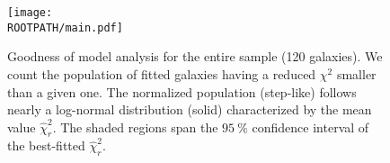 \begin{figure}%
	\centering%
	\texttt{[image: \\ROOTPATH/main.pdf]}%
	\caption{Goodness of model analysis for the entire sample (120 galaxies). We count the population of fitted galaxies having a reduced $\chi^2$ smaller than a given one. The normalized population (step-like) follows nearly a log-normal distribution (solid) characterized by the mean value $\hat \chi^2_r$. The shaded regions span the $\SI{95}{\percent}$ confidence interval of the best-fitted $\hat \chi^2_r$.}%
	\label{fig:goodness:all}
\end{figure}